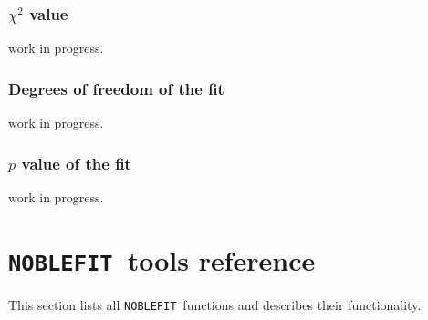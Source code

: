 \documentclass[12pt]{article}
\newcommand{\noblefit}{{\tt NOBLEFIT}}
\begin{document}
\subsubsection{$\chi^2$ value}
work in progress.

\subsubsection{Degrees of freedom of the fit}
work in progress.

\subsubsection{$p$ value of the fit}
work in progress.


\section{\noblefit\  tools reference}\label{sec:tools_ref}
This section lists all \noblefit\ functions and describes their functionality.





\end{document}
